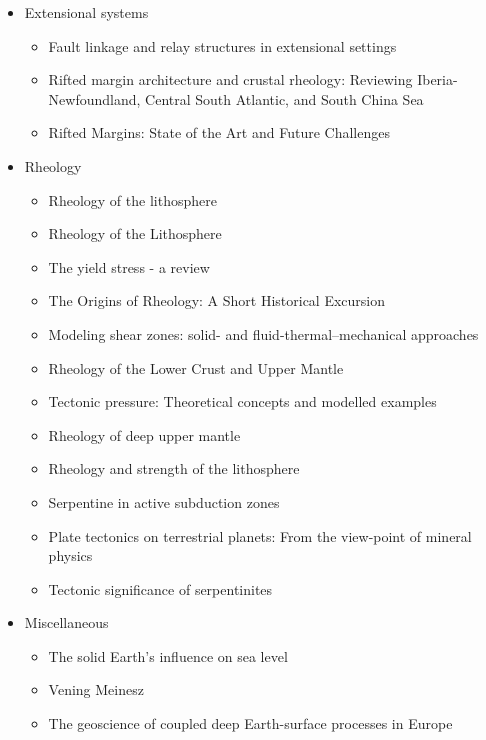\begin{itemize}
\item Extensional systems
   \begin{itemize}
   \item [\twothousandsixteen] Fault linkage and relay structures in extensional settings \cite{foro16}
   \item [\twothousandseventeen] Rifted margin architecture and crustal rheology: Reviewing 
                Iberia-Newfoundland, Central South Atlantic, and South China Sea \cite{brhc17}
   \item [\twothousandnineteen] Rifted Margins: State of the Art and Future Challenges \cite{pema19}\\
   \end{itemize}

\item Rheology 
   \begin{itemize}
   \item [\nineteeneightythree] Rheology of the lithosphere \cite{kirb83}
   \item [\nineteeneightyseven] Rheology of the Lithosphere \cite{kikr87}
   \item [\nineteenninetynine] The yield stress - a review \cite{barn99}
   \item [\twothousandtwo] The Origins of Rheology: A Short Historical Excursion \cite{dora02}
   \item [\twothousandthree] Modeling shear zones: solid- and fluid-thermal–mechanical approaches \cite{reyu03}
   \item [\twothousandeight] Rheology of the Lower Crust and Upper Mantle \cite{budr08}
   \item [\twothousandeight] Tectonic pressure: Theoretical concepts and modelled examples \cite{manc08}
   \item [\twothousandten] Rheology of deep upper mantle \cite{kara10}
   \item [\twothousandeleven] Rheology and strength of the lithosphere \cite{buro11}
   \item [\twothousandtwelve] Serpentine in active subduction zones \cite{reyn12}
   \item [\twothousandfourteen] Plate tectonics on terrestrial planets: From the view-point of mineral physics \cite{kara14}
   \item [\twothousandfifteen] Tectonic significance of serpentinites \cite{gusr15}
   \end{itemize}

\item Miscellaneous
   \begin{itemize}
   \item The solid Earth’s influence on sea level \cite{conr13}  
   \item Vening Meinesz \cite{vlaa89}
   \item The geoscience of coupled deep Earth-surface processes in Europe \cite{clzb07}
   \end{itemize}


\end{itemize}
